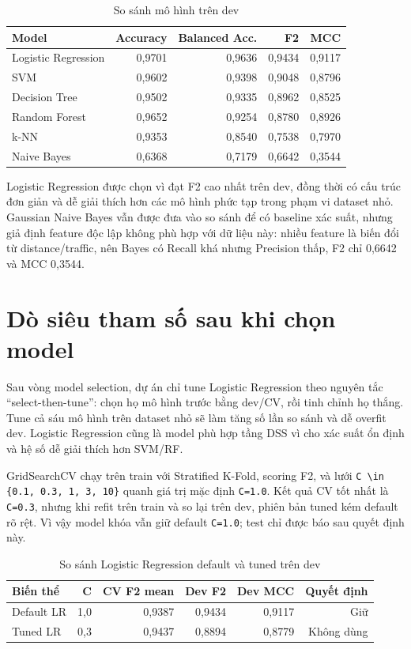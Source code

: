 \documentclass[12pt,a4paper,oneside]{report}
\newcommand{\code}[1]{\nolinkurl{#1}}
\begin{document}
\begin{table}[H]
\centering
\caption{So sánh mô hình trên dev}
\begin{tabular}{lrrrr}
\toprule
Model & Accuracy & Balanced Acc. & F2 & MCC\\
\midrule
Logistic Regression & 0,9701 & 0,9636 & 0,9434 & 0,9117\\
SVM & 0,9602 & 0,9398 & 0,9048 & 0,8796\\
Decision Tree & 0,9502 & 0,9335 & 0,8962 & 0,8525\\
Random Forest & 0,9652 & 0,9254 & 0,8780 & 0,8926\\
k-NN & 0,9353 & 0,8540 & 0,7538 & 0,7970\\
Naive Bayes & 0,6368 & 0,7179 & 0,6642 & 0,3544\\
\bottomrule
\end{tabular}
\end{table}

Logistic Regression được chọn vì đạt F2 cao nhất trên dev, đồng thời có cấu
trúc đơn giản và dễ giải thích hơn các mô hình phức tạp trong phạm vi dataset
nhỏ. Gaussian Naive Bayes vẫn được đưa vào so sánh để có baseline xác suất, nhưng
giả định feature độc lập không phù hợp với dữ liệu này: nhiều feature là biến
đổi từ distance/traffic, nên Bayes có Recall khá nhưng Precision thấp, F2 chỉ
0,6642 và MCC 0,3544.

\section{Dò siêu tham số sau khi chọn model}

Sau vòng model selection, dự án chỉ tune Logistic Regression theo nguyên tắc
``select-then-tune'': chọn họ mô hình trước bằng dev/CV, rồi tinh chỉnh họ thắng.
Tune cả sáu mô hình trên dataset nhỏ sẽ làm tăng số lần so sánh và dễ overfit
dev. Logistic Regression cũng là model phù hợp tầng DSS vì cho xác suất ổn định
và hệ số dễ giải thích hơn SVM/RF.

GridSearchCV chạy trên train với Stratified K-Fold, scoring F2, và lưới
\code{C \in \{0.1, 0.3, 1, 3, 10\}} quanh giá trị mặc định \code{C=1.0}. Kết quả
CV tốt nhất là \code{C=0.3}, nhưng khi refit trên train và so lại trên dev,
phiên bản tuned kém default rõ rệt. Vì vậy model khóa vẫn giữ default
\code{C=1.0}; test chỉ được báo sau quyết định này.

\begin{table}[H]
\centering
\caption{So sánh Logistic Regression default và tuned trên dev}
\begin{tabular}{lrrrrr}
\toprule
Biến thể & C & CV F2 mean & Dev F2 & Dev MCC & Quyết định\\
\midrule
Default LR & 1,0 & 0,9387 & 0,9434 & 0,9117 & Giữ\\
Tuned LR & 0,3 & 0,9437 & 0,8894 & 0,8779 & Không dùng\\
\bottomrule
\end{tabular}
\end{table}
\end{document}
